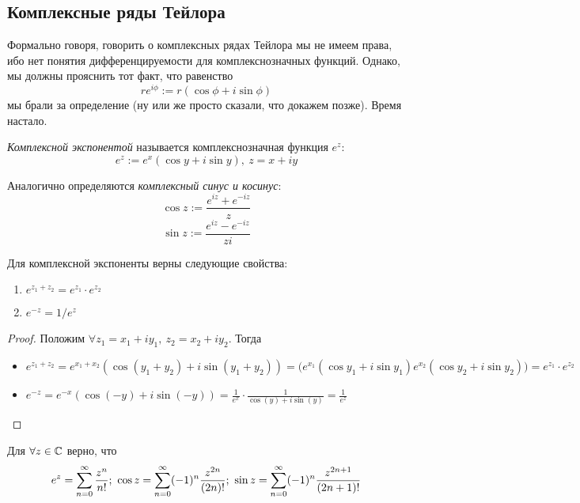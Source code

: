 \subsection{Комплексные ряды Тейлора}

\begin{note}
	Формально говоря, говорить о комплексных рядах Тейлора мы не имеем права, ибо нет понятия дифференцируемости для комплекснозначных функций. Однако, мы должны прояснить тот факт, что равенство
	\[
		re^{i\phi} := r(\cos \phi + i\sin \phi)
	\]
	мы брали за определение (ну или же просто сказали, что докажем позже). Время настало.
\end{note}

\begin{definition}
	\textit{Комплексной экспонентой} называется комплекснозначная функция $e^z$:
	\[
		e^z := e^x (\cos y + i \sin y),\ z = x + iy
	\]
\end{definition}

\begin{note}
	Аналогично определяются \textit{комплексный синус и косинус}:
	\[
		\cos z := \frac{e^{iz} + e^{-iz}}{z}
	\]
	\[
		\sin z := \frac{e^{iz} - e^{-iz}}{zi}
	\]
\end{note}

\begin{proposition}
	Для комплексной экспоненты верны следующие свойства:
	\begin{enumerate}
		\item \(e^{z_1 + z_2} = e^{z_1} \cdot e^{z_2}\)
		
		\item \(e^{-z} = 1 / e^z\)
	\end{enumerate}
\end{proposition}

\begin{proof}
	Положим $\forall z_1 = x_1 + iy_1,\ z_2 = x_2 + iy_2$. Тогда
	\begin{itemize}
		\item \(e^{z_1 + z_2} = e^{x_1 + x_2} (\cos(y_1 + y_2) + i\sin(y_1 + y_2)) = \big(e^{x_1}(\cos y_1 + i\sin y_1)e^{x_2}(\cos y_2 + i\sin y_2)\big) = e^{z_1} \cdot e^{z_2}\)
		
		\item \(e^{-z} = e^{-x}(\cos(-y) + i\sin(-y)) = \frac{1}{e^x} \cdot \frac{1}{\cos(y) + i\sin(y)} = \frac{1}{e^z}\)
	\end{itemize}
\end{proof}

\begin{theorem}
	Для $\forall z \in \mathbb{C}$ верно, что
	\[
		e^z = \sum_{n = 0}^\infty \frac{z^n}{n!};\ \cos z = \sum_{n = 0}^\infty (-1)^n \frac{z^{2n}}{(2n)!};\ \sin z = \sum_{n = 0}^\infty (-1)^n \frac{z^{2n + 1}}{(2n + 1)!}
	\]
\end{theorem}

